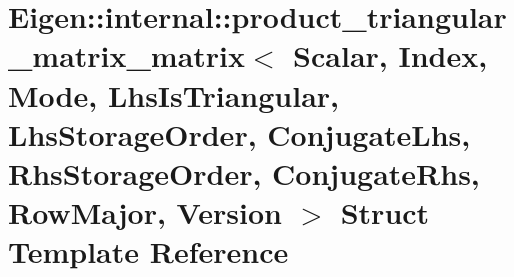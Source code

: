 \hypertarget{struct_eigen_1_1internal_1_1product__triangular__matrix__matrix_3_01_scalar_00_01_index_00_01_moa7595ecc6fa7617b9a7dfbf733dbf94b}{}\section{Eigen\+:\+:internal\+:\+:product\+\_\+triangular\+\_\+matrix\+\_\+matrix$<$ Scalar, Index, Mode, Lhs\+Is\+Triangular, Lhs\+Storage\+Order, Conjugate\+Lhs, Rhs\+Storage\+Order, Conjugate\+Rhs, Row\+Major, Version $>$ Struct Template Reference}
\label{struct_eigen_1_1internal_1_1product__triangular__matrix__matrix_3_01_scalar_00_01_index_00_01_moa7595ecc6fa7617b9a7dfbf733dbf94b}
